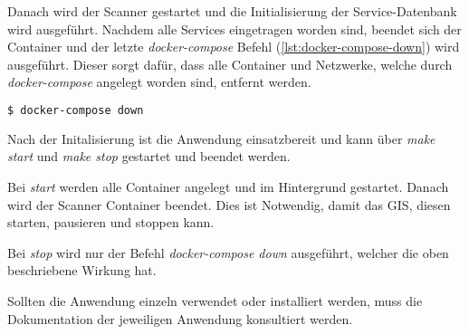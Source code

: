 Danach wird der Scanner gestartet und die Initialisierung der Service-Datenbank wird ausgeführt. Nachdem alle Services eingetragen worden sind, beendet sich der Container und der letzte \textit{docker-compose} Befehl (\ref{lst:docker-compose-down}) wird ausgeführt. Dieser sorgt dafür, dass alle Container und Netzwerke, welche durch \textit{docker-compose} angelegt worden sind, entfernt werden.

\begin{lstlisting}[language=bash, caption={Aufräumen mit docker-compose down (bash)}, captionpos=b, label={lst:docker-compose-down}]
$ docker-compose down
\end{lstlisting}

Nach der Initalisierung ist die Anwendung einsatzbereit und kann über \textit{make start} und \textit{make stop} gestartet und beendet werden.

Bei \textit{start} werden alle Container angelegt und im Hintergrund gestartet. Danach wird der Scanner Container beendet. Dies ist Notwendig, damit das GIS, diesen starten, pausieren und stoppen kann.

Bei \textit{stop} wird nur der Befehl \textit{docker-compose down} ausgeführt, welcher die oben beschriebene Wirkung hat.

Sollten die Anwendung einzeln verwendet oder installiert werden, muss die Dokumentation der jeweiligen Anwendung konsultiert werden.